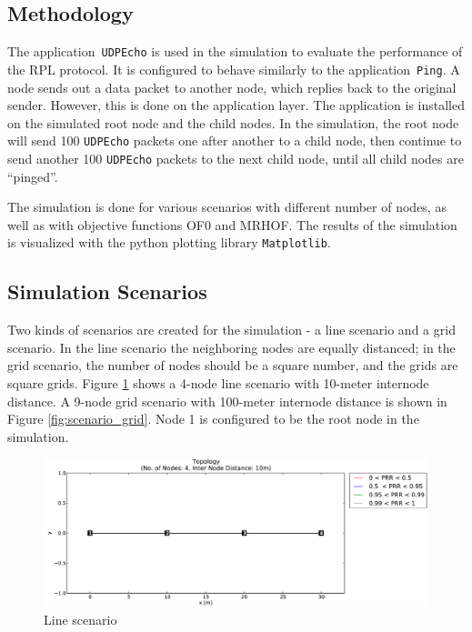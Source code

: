 \subsection{Methodology}
\label{Sim:Method}
The application~\texttt{UDPEcho} is used in the simulation to evaluate the performance of the RPL protocol. It is configured to behave similarly to the application~\texttt{Ping}. A node sends out a data packet to another node, which replies back to the original sender. However, this is done on the application layer. The application is installed on the simulated root node and the child nodes. In the simulation, the root node will send 100 \texttt{UDPEcho} packets one after another to a child node, then continue to send another 100 \texttt{UDPEcho} packets to the next child node, until all child nodes are  ``pinged''.     

The simulation is done for various scenarios with different number of nodes, as well as with objective functions OF0 and MRHOF. The results of the simulation is visualized with the python plotting library \texttt{Matplotlib}.

\subsection{Simulation Scenarios}
\label{Sim:Scenarios}

Two kinds of scenarios are created for the simulation - a line scenario and a grid scenario. In the line scenario the neighboring nodes are equally distanced; in the grid scenario, the number of nodes should be a square number, and the grids are square grids. Figure \ref{fig:scenario_line} shows a 4-node line scenario with 10-meter internode distance. A 9-node grid scenario with 100-meter internode distance is shown in Figure \ref{fig:scenario_grid}. Node 1 is configured to be the root node in the simulation.

\begin{figure}[htpb]
 	\centering
    \leavevmode
      \includegraphics[scale=0.35]{Pics/results/topo4_dist10_line.pdf}
    \caption{Line scenario}
    \label{fig:scenario_line}
\end{figure}

